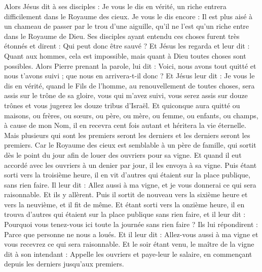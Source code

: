 \begin{multicols}{2}
Alors Jésus dit à ses disciples : Je vous le dis en vérité, un riche entrera difficilement dans le Royaume des cieux.
Je vous le dis encore : Il est plus aisé à un chameau de passer par le trou d'une aiguille, qu'il ne l'est qu'un riche entre dans le Royaume de Dieu.
Ses disciples ayant entendu ces choses furent très étonnés et dirent : Qui peut donc être sauvé ?
Et Jésus les regarda et leur dit : Quant aux hommes, cela est impossible, mais quant à Dieu toutes choses sont possibles.
Alors Pierre prenant la parole, lui dit : Voici, nous avons tout quitté et nous t'avons suivi ; que nous en arrivera-t-il donc ?
Et Jésus leur dit : Je vous le dis en vérité, quand le Fils de l'homme, au renouvellement de toutes choses, sera assis sur le trône de sa gloire, vous qui m'avez suivi, vous serez assis sur douze trônes et vous jugerez les douze tribus d'Israël.
Et quiconque aura quitté ou maisons, ou frères, ou sœurs, ou père, ou mère, ou femme, ou enfants, ou champs, à cause de mon Nom, il en recevra cent fois autant et héritera la vie éternelle.
Mais plusieurs qui sont les premiers seront les derniers et les derniers seront les premiers.
\VerseOne{} Car le Royaume des cieux est semblable à un père de famille, qui sortit dès le point du jour afin de louer des ouvriers pour sa vigne.
Et quand il eut accordé avec les ouvriers à un denier par jour, il les envoya à sa vigne.
Puis étant sorti vers la troisième heure, il en vit d'autres qui étaient sur la place publique, sans rien faire.
Il leur dit : Allez aussi à ma vigne, et je vous donnerai ce qui sera raisonnable.
Et ils y allèrent. Puis il sortit de nouveau vers la sixième heure et vers la neuvième, et il fit de même.
Et étant sorti vers la onzième heure, il en trouva d'autres qui étaient sur la place publique sans rien faire, et il leur dit : Pourquoi vous tenez-vous ici toute la journée sans rien faire ?
Ils lui répondirent : Parce que personne ne nous a loués. Et il leur dit : Allez-vous aussi à ma vigne et vous recevrez ce qui sera raisonnable.
Et le soir étant venu, le maître de la vigne dit à son intendant : Appelle les ouvriers et paye-leur le salaire, en commençant depuis les derniers jusqu'aux premiers.

\end{multicols}
